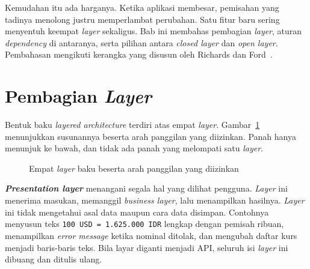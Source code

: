 Kemudahan itu ada harganya. Ketika aplikasi membesar, pemisahan yang tadinya
menolong justru memperlambat perubahan. Satu fitur baru sering menyentuh
keempat \textit{layer} sekaligus. Bab ini membahas pembagian \textit{layer}, aturan
\textit{dependency} di antaranya, serta pilihan
antara \textit{closed layer} dan
\textit{open layer}. Pembahasan mengikuti kerangka
yang disusun oleh Richards dan
Ford~\cite{richards2020fundamentals}.

\section{Pembagian \textit{Layer}}

Bentuk baku \textit{layered architecture} terdiri atas empat \textit{layer}.
Gambar~\ref{fig:lapisan-empat} menunjukkan susunannya beserta arah panggilan
yang diizinkan. Panah hanya menunjuk ke bawah, dan tidak ada panah yang
melompati satu \textit{layer}.

\begin{figure}[htbp]
  \centering
  \caption{Empat \textit{layer} baku beserta arah panggilan yang diizinkan}
  \label{fig:lapisan-empat}
\end{figure}

\textbf{\textit{Presentation layer}} menangani segala hal yang dilihat pengguna. \textit{Layer}
ini menerima masukan, memanggil \textit{business layer}, lalu menampilkan hasilnya.
\textit{Layer} ini tidak mengetahui asal data maupun cara data disimpan. Contohnya
menyusun teks \texttt{100 USD = 1.625.000 IDR} lengkap dengan pemisah ribuan,
menampilkan \textit{error message} ketika nominal ditolak, dan mengubah daftar kurs menjadi
baris-baris teks. Bila layar diganti menjadi API, seluruh isi \textit{layer} ini
dibuang dan ditulis ulang.

